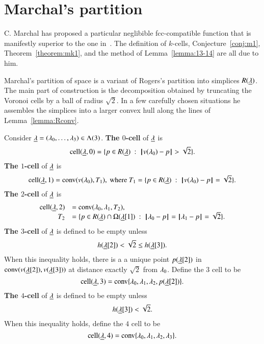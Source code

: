 \section{Marchal's partition}

C. Marchal has proposed a particular neglibible fcc-compatible function that is manifestly superior to the one in~\cite{Hales:2006:DCG}.  The definition of $k$-cells, Conjecture~\ref{conj:m1}, Theorem~\ref{theorem:mk1}, and the method of Lemma~\ref{lemma:13-14} are all due to him.


Marchal's partition of space is a variant of Rogers's partition into simplices $R({\underline{\lambda}})$.  The main part of construction is  the decomposition obtained by truncating the Voronoi cells by a ball of radius $\sqrt2$.  In a few carefully chosen situations he assembles the simplices into a larger convex hull along the lines of Lemma~\ref{lemma:Rconv}.



\begin{definition} Consider ${\underline{\lambda}}=(\lambda_0,\ldots,\lambda_3)\in \Lambda(3)$.
\hfill\break\smallskip  
{\bf The $0$-cell} of ${\underline{\lambda}}$ is
$$
\operatorname{cell}({\underline{\lambda}},0) = \{p\in R({\underline{\lambda}}) \ :\  {\hskip0.1em|\hskip-0.15em|\hskip0.1em}v(\lambda_0) - p{\hskip0.1em|\hskip-0.15em|\hskip0.1em} > \sqrt2\}.
$$
\bigskip
{\bf The $1$-cell} of ${\underline{\lambda}}$ is 
$$
\operatorname{cell}({\underline{\lambda}},1) = {\operatorname{conv}}(v(\lambda_0),T_1),\hbox{ where } T_1 = \{p \in R({\underline{\lambda}}) \ :\  {\hskip0.1em|\hskip-0.15em|\hskip0.1em}v(\lambda_0) - p{\hskip0.1em|\hskip-0.15em|\hskip0.1em}= \sqrt2\}.
$$
\bigskip
{\bf The $2$-cell} of ${\underline{\lambda}}$ is
$$
\begin{array}{rll}
\operatorname{cell}({\underline{\lambda}},2) &= {\operatorname{conv}}(\lambda_0,\lambda_1,T_2),\quad \\
  T_2 &= \{p \in R({\underline{\lambda}})\cap \Omega({\underline{\lambda}}[1]) \ :\  {\hskip0.1em|\hskip-0.15em|\hskip0.1em}\lambda_0 - p{\hskip0.1em|\hskip-0.15em|\hskip0.1em}={\hskip0.1em|\hskip-0.15em|\hskip0.1em}\lambda_1 - p{\hskip0.1em|\hskip-0.15em|\hskip0.1em} =\sqrt2\}.
\end{array}
$$
\bigskip
{\bf The $3$-cell} of ${\underline{\lambda}}$ is defined to be empty unless 
$$
h({\underline{\lambda}}[2]) <\sqrt2 \le h({\underline{\lambda}}[3]).
$$
When this inequality holds,
there is a a unique point $p({\underline{\lambda}}[2])$ in
${\operatorname{conv}}(v({\underline{\lambda}}[2]),v({\underline{\lambda}}[3]))$ at distance exactly $\sqrt2$ from $\lambda_0$.  
Define the $3$ cell to be
$$
\operatorname{cell}({\underline{\lambda}},3) = {\operatorname{conv}}\{\lambda_0,\lambda_1,\lambda_2,p({\underline{\lambda}}[2])\}.
$$
\bigskip
{\bf The $4$-cell} of ${\underline{\lambda}}$ is defined to be empty unless
$$
h({\underline{\lambda}}[3]) <\sqrt2.
$$
When this inequality holds, define the $4$ cell to be
$$
\operatorname{cell}({\underline{\lambda}},4) = {\operatorname{conv}}\{\lambda_0,\lambda_1,\lambda_2,\lambda_3\}.
$$
\end{definition}

